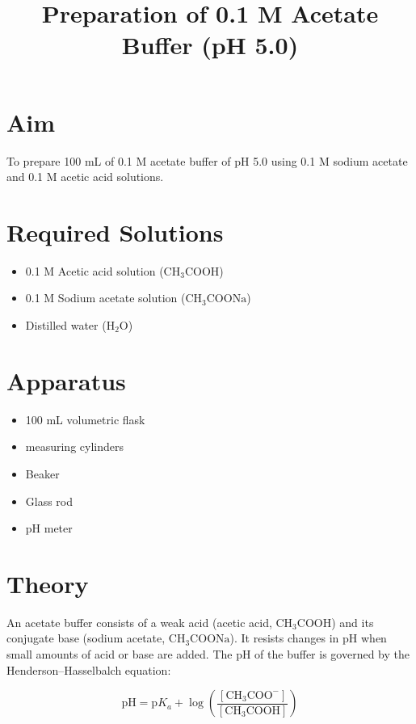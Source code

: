 \documentclass[12pt]{article}
\title{\textbf{Preparation of 0.1 M Acetate Buffer (pH 5.0)}}
\author{}
\date{}
\begin{document}
	
	\maketitle
	
	\section*{Aim}
	
	To prepare 100 mL of 0.1 M acetate buffer of pH 5.0 using 0.1 M sodium acetate and 0.1 M acetic acid solutions.
	
	\section*{Required Solutions}
	
	\begin{itemize}
		\item 0.1 M Acetic acid solution (\(\mathrm{CH_3COOH}\))
		\item 0.1 M Sodium acetate solution (\(\mathrm{CH_3COONa}\))
		\item Distilled water (\(\mathrm{H_2O}\))
	\end{itemize}
	
	\section*{Apparatus}
	
	\begin{itemize}
		\item 100 mL volumetric flask
		\item measuring cylinders
		\item Beaker
		\item Glass rod
		\item pH meter
	\end{itemize}
	
	\section*{Theory}
	
	An acetate buffer consists of a weak acid (acetic acid, \(\mathrm{CH_3COOH}\)) and its conjugate base (sodium acetate, \(\mathrm{CH_3COONa}\)). It resists changes in pH when small amounts of acid or base are added. The pH of the buffer is governed by the Henderson--Hasselbalch equation:
	
	\[
	\mathrm{pH}=\mathrm{p}K_a+\log\left(\frac{[\mathrm{CH_3COO^-}]}{[\mathrm{CH_3COOH}]}\right)
	\]
	
\end{document}
